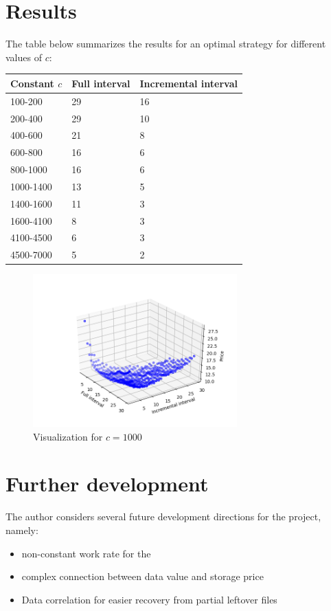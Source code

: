 \documentclass[11pt, a4paper]{article}
\theoremstyle{definition}
\begin{document}
\section{Results}
	The table below summarizes the results for an optimal strategy for different values of $c$:
	\begin{center}
		\begin{tabular}{| l | l | l |}
			\hline
			Constant $c$ & Full interval & Incremental interval\\ \hline
			100-200 & 29 & 16\\ \hline
			200-400 & 29 & 10\\ \hline
			400-600 & 21 & 8\\ \hline
			600-800 & 16 & 6\\ \hline
			800-1000 & 16 & 6\\ \hline
			1000-1400 & 13 & 5\\ \hline
			1400-1600 & 11 & 3\\ \hline
			1600-4100 & 8 & 3\\ \hline
			4100-4500 & 6 & 3\\ \hline
			4500-7000 & 5 & 2\\ \hline
		\end{tabular}
	\end{center}
	\begin{figure}[H]
		\begin{minipage}{1.0\textwidth}
			\centering
			\includegraphics[width=0.7\textwidth]{3d_all_1.png}
			\caption{Visualization for $c=1000$}\label{Fig:Whole_model}
		\end{minipage}
	\end{figure}
	\newpage
\section{Further development}
	The author considers several future development directions for the project, namely:
	\begin{itemize}
		\item non-constant work rate for the 
		\item complex connection between data value and storage price
		\item Data correlation for easier recovery from partial leftover files
	\end{itemize}
\end{document}
